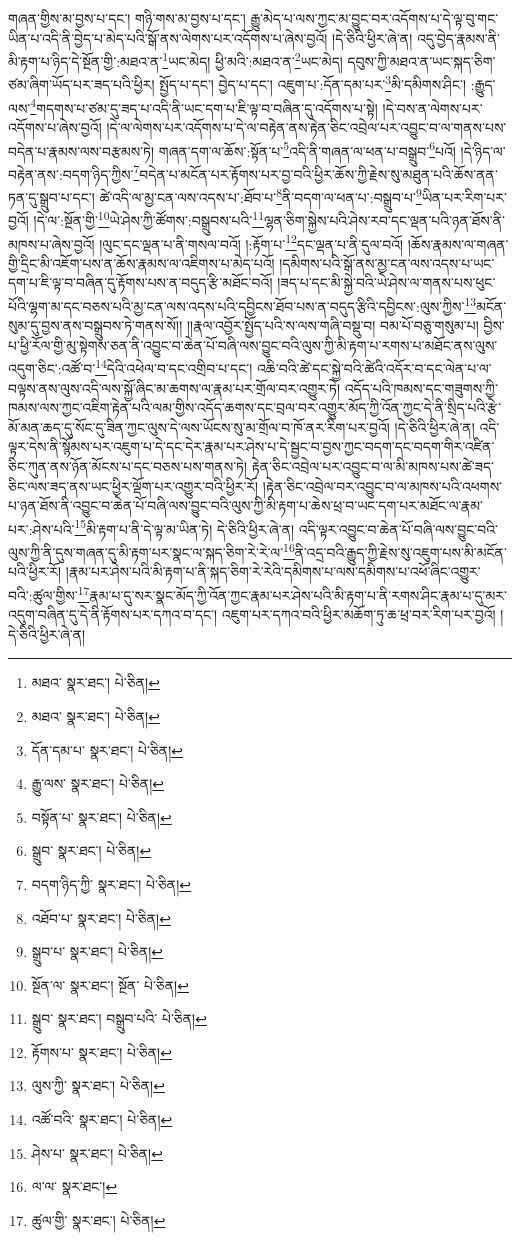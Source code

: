 གཞན་གྱིས་མ་བྱས་པ་དང་། གཉི་གས་མ་བྱས་པ་དང་། རྒྱུ་མེད་པ་ལས་ཀྱང་མ་བྱུང་བར་འདོགས་པ་དེ་ལྟ་བུ་གང་ཡིན་པ་འདི་ནི་བྱེད་པ་མེད་པའི་སྒོ་ནས་ལེགས་པར་འདོགས་པ་ཞེས་བྱའོ། །དེ་ཅིའི་ཕྱིར་ཞེ་ན། འདུ་བྱེད་རྣམས་ནི་མི་རྟག་པ་ཉིད་དེ་སྔོན་གྱི་:མཐའ་ན་\footnote{མཐའ་  སྣར་ཐང་།  པེ་ཅིན། }ཡང་མེད། ཕྱི་མའི་:མཐའ་ན་\footnote{མཐའ་  སྣར་ཐང་།  པེ་ཅིན། }ཡང་མེད། དབུས་ཀྱི་མཐའ་ན་ཡང་སྐད་ཅིག་ཙམ་ཞིག་ཡོད་པར་ཟད་པའི་ཕྱིར། སྤྱོད་པ་དང་། བྱེད་པ་དང་། འཇུག་པ་:དོན་དམ་པར་\footnote{དོན་དམ་པ་  སྣར་ཐང་།  པེ་ཅིན། }མི་དམིགས་ཤིང་། :རྒྱུད་ལས་\footnote{རྒྱུ་ལས་  སྣར་ཐང་།  པེ་ཅིན། }གདགས་པ་ཙམ་དུ་ཟད་པ་འདི་ནི་ཡང་དག་པ་ཇི་ལྟ་བ་བཞིན་དུ་འདོགས་པ་སྟེ། །དེ་བས་ན་ལེགས་པར་འདོགས་པ་ཞེས་བྱའོ། །དེ་ལ་ལེགས་པར་འདོགས་པ་དེ་ལ་བརྟེན་ནས་རྟེན་ཅིང་འབྲེལ་པར་འབྱུང་བ་ལ་གནས་པས་བདེན་པ་རྣམས་ལས་བརྩམས་ཏེ། གཞན་དག་ལ་ཆོས་:སྟོན་པ་\footnote{བསྟོན་པ་  སྣར་ཐང་།  པེ་ཅིན། }འདི་ནི་གཞན་ལ་ཕན་པ་བསྒྲུབ་\footnote{སྒྲུབ་  སྣར་ཐང་།  པེ་ཅིན། }པའོ། །དེ་ཉིད་ལ་བརྟེན་ནས་:བདག་ཉིད་ཀྱིས་\footnote{བདག་ཉིད་ཀྱི་  སྣར་ཐང་།  པེ་ཅིན། }བདེན་པ་མངོན་པར་རྟོགས་པར་བྱ་བའི་ཕྱིར་ཆོས་ཀྱི་རྗེས་སུ་མཐུན་པའི་ཆོས་ནན་ཏན་དུ་སྒྲུབ་པ་དང་། ཚེ་འདི་ལ་མྱ་ངན་ལས་འདས་པ་:ཐོབ་པ་\footnote{འཐོབ་པ་  སྣར་ཐང་།  པེ་ཅིན། }ནི་བདག་ལ་ཕན་པ་:བསྒྲུབ་པ་\footnote{སྒྲུབ་པ་  སྣར་ཐང་།  པེ་ཅིན། }ཡིན་པར་རིག་པར་བྱའོ། །དེ་ལ་:སྔོན་གྱི་\footnote{སྔོན་ལ་  སྣར་ཐང་། སྔོན་  པེ་ཅིན། }ཡེ་ཤེས་ཀྱི་ཚོགས་:བསྒྲུབས་པའི་\footnote{སྒྲུབ་  སྣར་ཐང་། བསྒྲུབ་པའི་  པེ་ཅིན། }ལྷན་ཅིག་སྐྱེས་པའི་ཤེས་རབ་དང་ལྡན་པའི་ཉན་ཐོས་ནི་མཁས་པ་ཞེས་བྱའོ། །ལུང་དང་ལྡན་པ་ནི་གསལ་བའོ། །:རྟོག་པ་\footnote{རྟོགས་པ་  སྣར་ཐང་།  པེ་ཅིན། }དང་ལྡན་པ་ནི་དུལ་བའོ། །ཆོས་རྣམས་ལ་གཞན་གྱི་དྲིང་མི་འཇོག་པས་ན་ཆོས་རྣམས་ལ་འཇིགས་པ་མེད་པའོ། །དམིགས་པའི་སྒོ་ནས་མྱ་ངན་ལས་འདས་པ་ཡང་དག་པ་ཇི་ལྟ་བ་བཞིན་དུ་རྟོགས་པས་ན་བདུད་རྩི་མཐོང་བའོ། །ཟད་པ་དང་མི་སྐྱེ་བའི་ཡེ་ཤེས་ལ་གནས་པས་ཕུང་པོའི་ལྷག་མ་དང་བཅས་པའི་མྱ་ངན་ལས་འདས་པའི་དབྱིངས་ཐོབ་པས་ན་བདུད་རྩིའི་དབྱིངས་:ལུས་ཀྱིས་\footnote{ལུས་ཀྱི་  སྣར་ཐང་།  པེ་ཅིན། }མངོན་སུམ་དུ་བྱས་ནས་བསྒྲུབས་ཏེ་གནས་སོ།། །།རྣལ་འབྱོར་སྤྱོད་པའི་ས་ལས་གཞི་བསྡུ་བ། བམ་པོ་བཅུ་གསུམ་པ། བྱིས་པ་ཕྱི་རོལ་གྱི་མུ་སྟེགས་ཅན་ནི་འབྱུང་བ་ཆེན་པོ་བཞི་ལས་བྱུང་བའི་ལུས་ཀྱི་མི་རྟག་པ་རགས་པ་མཐོང་ནས་ལུས་འདུག་ཅིང་:འཚོ་བ་\footnote{འཚོ་བའི་  སྣར་ཐང་།  པེ་ཅིན། }དེའི་འཕེལ་བ་དང་འགྲིབ་པ་དང་། འཆི་བའི་ཚེ་དང་སྐྱེ་བའི་ཚེའི་འདོར་བ་དང་ལེན་པ་ལ་བལྟས་ནས་ལུས་འདི་ལས་སྐྱོ་ཞིང་མ་ཆགས་ལ་རྣམ་པར་གྲོལ་བར་འགྱུར་ཏེ། འདོད་པའི་ཁམས་དང་གཟུགས་ཀྱི་ཁམས་ལས་ཀྱང་འཇིག་རྟེན་པའི་ལམ་གྱིས་འདོད་ཆགས་དང་བྲལ་བར་འགྱུར་མོད་ཀྱི་འོན་ཀྱང་དེ་ནི་སྲིད་པའི་རྩེ་མོ་མན་ཆད་དུ་སོང་དུ་ཟིན་ཀྱང་ལུས་དེ་ལས་ཡོངས་སུ་མ་གྲོལ་བ་ཁོ་ནར་རིག་པར་བྱའོ། །དེ་ཅིའི་ཕྱིར་ཞེ་ན། འདི་ལྟར་དེས་ནི་སྙོམས་པར་འཇུག་པ་དེ་དང་དེར་རྣམ་པར་ཤེས་པ་དེ་སྦྱང་བ་བྱས་ཀྱང་བདག་དང་བདག་གིར་འཛིན་ཅིང་ཀུན་ནས་ཉོན་མོངས་པ་དང་བཅས་པས་གནས་ཏེ། རྟེན་ཅིང་འབྲེལ་པར་འབྱུང་བ་ལ་མི་མཁས་པས་ཚེ་ཟད་ཅིང་ལས་ཟད་ནས་ཡང་ཕྱིར་ལྡོག་པར་འགྱུར་བའི་ཕྱིར་རོ། །རྟེན་ཅིང་འབྲེལ་བར་འབྱུང་བ་ལ་མཁས་པའི་འཕགས་པ་ཉན་ཐོས་ནི་འབྱུང་བ་ཆེན་པོ་བཞི་ལས་བྱུང་བའི་ལུས་ཀྱི་མི་རྟག་པ་ཆེས་ཕྲ་བ་ཡང་དག་པར་མཐོང་ལ་རྣམ་པར་:ཤེས་པའི་\footnote{ཤེས་པ་  སྣར་ཐང་།  པེ་ཅིན། }མི་རྟག་པ་ནི་དེ་ལྟ་མ་ཡིན་ཏེ། དེ་ཅིའི་ཕྱིར་ཞེ་ན། འདི་ལྟར་འབྱུང་བ་ཆེན་པོ་བཞི་ལས་བྱུང་བའི་ལུས་ཀྱི་ནི་དུས་གཞན་དུ་མི་རྟག་པར་སྣང་ལ་སྐད་ཅིག་རེ་རེ་ལ་\footnote{ལ་ལ་  སྣར་ཐང་། }ནི་འདྲ་བའི་རྒྱུད་ཀྱི་རྗེས་སུ་འཇུག་པས་མི་མངོན་པའི་ཕྱིར་རོ། །རྣམ་པར་ཤེས་པའི་མི་རྟག་པ་ནི་སྐད་ཅིག་རེ་རེའི་དམིགས་པ་ལས་དམིགས་པ་འཕོ་ཞིང་འགྱུར་བའི་:ཚུལ་གྱིས་\footnote{ཚུལ་གྱི་  སྣར་ཐང་།  པེ་ཅིན། }རྣམ་པ་དུ་སར་སྣང་མོད་ཀྱི་འོན་ཀྱང་རྣམ་པར་ཤེས་པའི་མི་རྟག་པ་ནི་རགས་ཤིང་རྣམ་པ་དུ་མར་འདུག་བཞིན་དུ་དེ་ནི་རྟོགས་པར་དཀའ་བ་དང་། འཇུག་པར་དཀའ་བའི་ཕྱིར་མཆོག་ཏུ་ཆ་ཕྲ་བར་རིག་པར་བྱའོ། །དེ་ཅིའི་ཕྱིར་ཞེ་ན། 